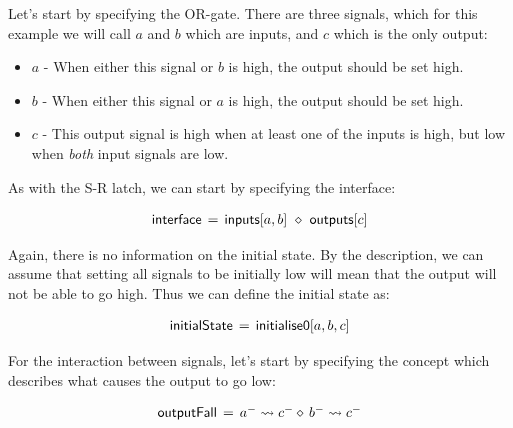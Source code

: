 \documentclass[british,conference,compsoc]{IEEEtran}
\begin{document}
Let's start by specifying the OR-gate. There are three signals, which for this 
example we will call $a$ and $b$ which are inputs, and $c$ which is the only output:

\begin{itemize}
  \item $a$ - When either this signal or $b$ is high, the output should be set high.
  \item $b$ - When either this signal or $a$ is high, the output should be set high.
  \item $c$ - This output signal is high when at least one of the inputs is high, but low when
		\emph{both} input signals are low.
\end{itemize}

As with the S-R latch, we can start by specifying the interface: 


\[
\begin{array}{lcl}
\mathsf{interface}&\hspace{-2mm}=&\hspace{-2mm}\mathsf{inputs}[a, b]~\diamond~\mathsf{outputs}[c]
\end{array}
\]

\noindent Again, there is no information on the initial state. By the description, we can
assume that setting all signals to be initially low will mean that the output
will not be able to go high. Thus we can define the initial state as:


\[
\begin{array}{lcl}
\mathsf{initialState}&\hspace{-2mm}=&\hspace{-2mm}\mathsf{initialise0} [a, b, c]
\end{array}
\]

\noindent For the interaction between signals, let's start by specifying the concept which 
describes what causes the output to go low:

\[
\begin{array}{lcl}
\mathsf{outputFall}&\hspace{-2mm}=&\hspace{-2mm}a^{-} \rightsquigarrow c^{-} \diamond\, b^{-} \rightsquigarrow c^{-}
\end{array}
\]
\end{document}
